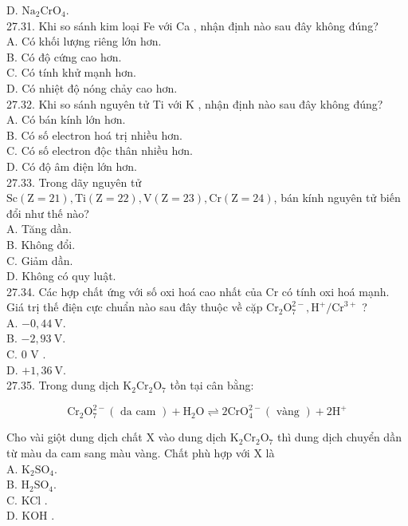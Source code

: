 \documentclass[10pt]{article}
\begin{document}
D. $\mathrm{Na}_{2} \mathrm{CrO}_{4}$.\\
27.31. Khi so sánh kim loại Fe với Ca , nhận định nào sau đây không đúng?\\
A. Có khối lượng riêng lớn hơn.\\
B. Có độ cứng cao hơn.\\
C. Có tính khử mạnh hơn.\\
D. Có nhiệt độ nóng chảy cao hơn.\\
27.32. Khi so sánh nguyên tử Ti với K , nhận định nào sau đây không đúng?\\
A. Có bán kính lớn hơn.\\
B. Có số electron hoá trị nhiều hơn.\\
C. Có số electron độc thân nhiều hơn.\\
D. Có độ âm điện lớn hơn.\\
27.33. Trong dãy nguyên tử $\mathrm{Sc}(\mathrm{Z}=21), \mathrm{Ti}(\mathrm{Z}=22), \mathrm{V}(\mathrm{Z}=23), \mathrm{Cr}(\mathrm{Z}=24)$, bán kính nguyên tử biến đổi như thế nào?\\
A. Tăng dần.\\
B. Không đổi.\\
C. Giảm dần.\\
D. Không có quy luật.\\
27.34. Các hợp chất ứng với số oxi hoá cao nhất của Cr có tính oxi hoá mạnh. Giá trị thế điện cực chuẩn nào sau đây thuộc về cặp $\mathrm{Cr}_{2} \mathrm{O}_{7}^{2-}, \mathrm{H}^{+} / \mathrm{Cr}^{3+}$ ?\\
A. $-0,44 \mathrm{~V}$.\\
B. $-2,93 \mathrm{~V}$.\\
C. 0 V .\\
D. $+1,36 \mathrm{~V}$.\\
27.35. Trong dung dịch $\mathrm{K}_{2} \mathrm{Cr}_{2} \mathrm{O}_{7}$ tồn tại cân bằng:

$$
\mathrm{Cr}_{2} \mathrm{O}_{7}^{2-}(\text { da cam })+\mathrm{H}_{2} \mathrm{O} \rightleftharpoons 2 \mathrm{CrO}_{4}^{2-}(\text { vàng })+2 \mathrm{H}^{+}
$$

Cho vài giột dung dịch chất X vào dung dịch $\mathrm{K}_{2} \mathrm{Cr}_{2} \mathrm{O}_{7}$ thì dung dịch chuyển dần từ màu da cam sang màu vàng. Chất phù hợp với X là\\
A. $\mathrm{K}_{2} \mathrm{SO}_{4}$.\\
B. $\mathrm{H}_{2} \mathrm{SO}_{4}$.\\
C. KCl .\\
D. KOH .
\end{document}
